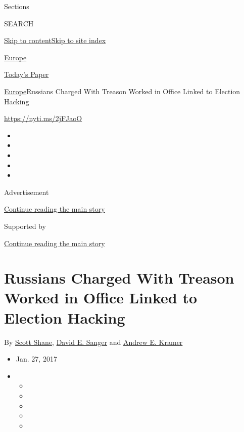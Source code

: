 Sections

SEARCH

\protect\hyperlink{site-content}{Skip to
content}\protect\hyperlink{site-index}{Skip to site index}

\href{https://www.nytimes.com/section/world/europe}{Europe}

\href{https://myaccount.nytimes.com/auth/login?response_type=cookie\&client_id=vi}{}

\href{https://www.nytimes.com/section/todayspaper}{Today's Paper}

\href{/section/world/europe}{Europe}\textbar{}Russians Charged With
Treason Worked in Office Linked to Election Hacking

\url{https://nyti.ms/2jFJaoO}

\begin{itemize}
\item
\item
\item
\item
\item
\end{itemize}

Advertisement

\protect\hyperlink{after-top}{Continue reading the main story}

Supported by

\protect\hyperlink{after-sponsor}{Continue reading the main story}

\hypertarget{russians-charged-with-treason-worked-in-office-linked-to-election-hacking}{%
\section{Russians Charged With Treason Worked in Office Linked to
Election
Hacking}\label{russians-charged-with-treason-worked-in-office-linked-to-election-hacking}}

By \href{http://www.nytimes.com/by/scott-shane}{Scott Shane},
\href{http://www.nytimes.com/by/david-e-sanger}{David E. Sanger} and
\href{http://www.nytimes.com/by/andrew-e-kramer}{Andrew E. Kramer}

\begin{itemize}
\item
  Jan. 27, 2017
\item
  \begin{itemize}
  \item
  \item
  \item
  \item
  \item
  \end{itemize}
\end{itemize}

